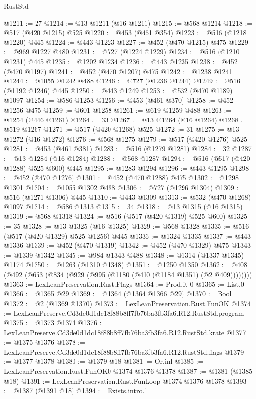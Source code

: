 \begin{lexlean}{RustStd}
\begin{coremodule}
@1211 := 27
@1214 := @13 @1211 (@16 @1211)
@1215 := @568 @1214
@1218 := @517 (@420 @1215) @525
@1220 := @453 (@461 @354)
@1223 := @516 (@1218 @1220) @445
@1224 := @443 @1223
@1227 := @452 (@470 @1215) @475
@1229 := @969 @1227 @480
@1231 := @727 (@1224 @1229)
@1234 := @516 (@1210 @1231) @445
@1235 := @1202 @1234
@1236 := @443 @1235
@1238 := @452 (@470 @1197)
@1241 := @452 (@470 @1207) @475
@1242 := @1238 @1241
@1244 := @1055 @1242 @488
@1246 := @727 (@1236 @1244)
@1249 := @516 (@1192 @1246) @445
@1250 := @443 @1249
@1253 := @532 (@470 @1189) @1097
@1254 := @586 @1253
@1256 := @453 (@461 @370)
@1258 := @452 @1256 @475
@1259 := @601 @1258
@1261 := @619 @1259 @488
@1263 := @1254 (@446 @1261)
@1264 := 33
@1267 := @13 @1264 (@16 @1264)
@1268 := @519 @1267
@1271 := @517 (@420 @1268) @525
@1272 := 31
@1275 := @13 @1272 (@16 @1272)
@1276 := @568 @1275
@1279 := @517 (@420 @1276) @525
@1281 := @453 (@461 @381)
@1283 := @516 (@1279 @1281)
@1284 := 32
@1287 := @13 @1284 (@16 @1284)
@1288 := @568 @1287
@1294 := @516 (@517 (@420 @1288) @525 @600) @445
@1295 := @1283 @1294
@1296 := @443 @1295
@1298 := @452 (@470 @1276)
@1301 := @452 (@470 @1288) @475
@1302 := @1298 @1301
@1304 := @1055 @1302 @488
@1306 := @727 (@1296 @1304)
@1309 := @516 (@1271 @1306) @445
@1310 := @443 @1309
@1313 := @532 (@470 @1268) @1097
@1314 := @586 @1313
@1315 := 34
@1318 := @13 @1315 (@16 @1315)
@1319 := @568 @1318
@1324 := @516 (@517 (@420 @1319) @525 @600)
@1325 := 35
@1328 := @13 @1325 (@16 @1325)
@1329 := @568 @1328
@1335 := @516 (@517 (@420 @1329) @525 @1256) @445
@1336 := @1324 @1335
@1337 := @443 @1336
@1339 := @452 (@470 @1319)
@1342 := @452 (@470 @1329) @475
@1343 := @1339 @1342
@1345 := @984 @1343 @488
@1348 := @1314 (@1337 @1345) @1174
@1350 := @1263 (@1310 @1348)
@1351 := @1250 @1350
@1362 := @408 (@492 (@653 (@834 (@929 (@995 (@1180 (@410 (@1184 @1351) (@2 @409))))))))
@1363 := LexLeanPreservation.Rust.Flags
@1364 := Prod.{0, 0}
@1365 := List.{0}
@1366 := @1365 @29
@1369 := @1364 (@1364 @1366 @29)
@1370 := Bool
@1372 := @2 (@1369 @1370)
@1373 := LexLeanPreservation.Rust.FunOK
@1374 := LexLeanPreserve.Cd3de0d1dc18f88b8ff7fb76ba3fb3fa6.R12.RustStd.program
@1375 := @1373 @1374
@1376 := LexLeanPreserve.Cd3de0d1dc18f88b8ff7fb76ba3fb3fa6.R12.RustStd.krate
@1377 := @1375 @1376
@1378 := LexLeanPreserve.Cd3de0d1dc18f88b8ff7fb76ba3fb3fa6.R12.RustStd.flags
@1379 := @1377 @1378
@1380 := @1379 @18
@1381 := Or.inl
@1385 := LexLeanPreservation.Rust.FunOK0 @1374 @1376 @1378
@1387 := @1381 (@1385 @18)
@1391 := LexLeanPreservation.Rust.FunLoop @1374 @1376 @1378
@1393 := @1387 (@1391 @18)
@1394 := Exists.intro.{1}

\end{coremodule}
\end{lexlean}
